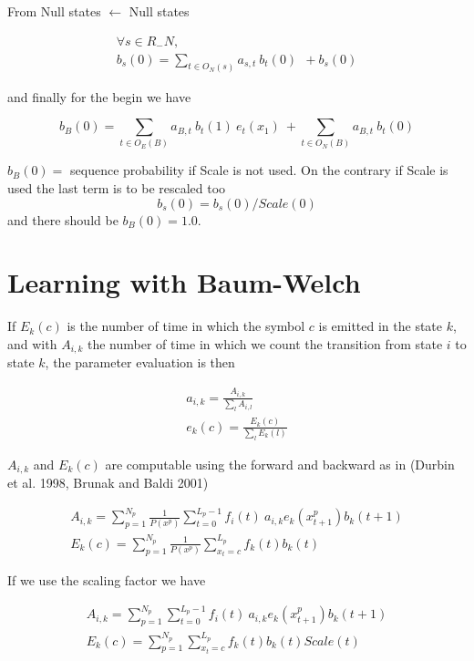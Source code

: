 \documentclass[11pt,english]{article}
\begin{document}
From Null states \( \leftarrow  \) Null states 

\[
\begin{array}{c}
\forall s\in R_{-}N,\\
b_{s}(0)=\sum _{t\in O_{N}(s)}a_{s,t}\: b_{t}(0)\: \: +b_{s}(0)
\end{array}\]

and finally for the begin we have

\[
b_{B}(0)=\sum _{t\in O_{E}(B)}a_{B,t}\: b_{t}(1)\: e_{t}(x_{1})\: +\sum _{t\in O_{N}(B)}a_{B,t}\: b_{t}(0)\]


\( b_{B}(0)= \) sequence probability if Scale is not used.
On the contrary if Scale is used the last term is to be rescaled
too \[
b_{s}(0)=b_{s}(0)/Scale(0)\] and there should be \( b_{B}(0)=1.0 \).


\section{Learning with Baum-Welch}

If \( E_{k}(c) \) is the number of time in which the symbol $c$
is emitted in the state $k$, and with \( A_{i,k} \) the number
of time in which we count the transition from state
$i$ to state $k$, the parameter evaluation is then

\[
\begin{array}{c}
a_{i,k}=\frac{A_{i,k}}{\sum _{l}A_{i,l}}\\
e_{k}(c)=\frac{E_{k}(c)}{\sum _{l}E_{k}(l)}
\end{array}\]

\( A_{i,k} \) and \( E_{k}(c) \) are computable using
the forward and backward as in (Durbin et al. 1998, Brunak and Baldi 2001)

\[
\begin{array}{c}
A_{i,k}=\sum ^{N_{p}}_{p=1}\frac{1}{P(x^{p})}\sum ^{L_{p}-1}_{t=0}f_{i}(t)\: a_{i,k}e_{k}(x^{p}_{t+1})b_{k}(t+1)\\
E_{k}(c)=\sum ^{N_{p}}_{p=1}\frac{1}{P(x^{p})}\sum ^{L_{p}}_{x_{t}=c}f_{k}(t)b_{k}(t)
\end{array}\]

If we use the scaling factor we have 

\[
\begin{array}{c}
A_{i,k}=\sum ^{N_{p}}_{p=1}\sum ^{L_{p}-1}_{t=0}f_{i}(t)\: a_{i,k}e_{k}(x^{p}_{t+1})b_{k}(t+1)\\
E_{k}(c)=\sum ^{N_{p}}_{p=1}\sum ^{L_{p}}_{x_{t}=c}f_{k}(t)b_{k}(t)Scale(t)
\end{array}\]
\end{document}
